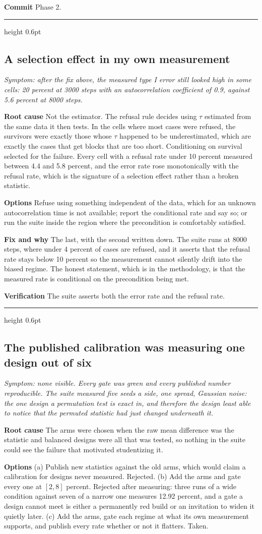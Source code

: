 \documentclass[11pt,a4paper]{article}
\newcommand{\entry}[2]{%
  \vspace{0.6em}%
  {\color{rulegrey}\hrule height 0.6pt}%
  \vspace{0.5em}%
  \subsection*{#1}%
  \textit{\small #2}\par\vspace{0.3em}%
}
\newcommand{\field}[1]{\vspace{0.35em}\textbf{#1}\quad}
\begin{document}
\field{Commit} Phase 2.

\entry{A selection effect in my own measurement}{Symptom: after the fix above,
the measured type I error still looked high in some cells: 20 percent at 3000
steps with an autocorrelation coefficient of 0.9, against 5.6 percent at 8000
steps.}

\field{Root cause} Not the estimator. The refusal rule decides using $\tau$
estimated from the same data it then tests. In the cells where most cases were
refused, the survivors were exactly those whose $\tau$ happened to be
underestimated, which are exactly the cases that get blocks that are too short.
Conditioning on survival selected for the failure. Every cell with a refusal rate
under 10 percent measured between 4.4 and 5.8 percent, and the error rate rose
monotonically with the refusal rate, which is the signature of a selection effect
rather than a broken statistic.

\field{Options} Refuse using something independent of the data, which for an
unknown autocorrelation time is not available; report the conditional rate and
say so; or run the suite inside the region where the precondition is comfortably
satisfied.

\field{Fix and why} The last, with the second written down. The suite runs at
8000 steps, where under 4 percent of cases are refused, and it asserts that the
refusal rate stays below 10 percent so the measurement cannot silently drift into
the biased regime. The honest statement, which is in the methodology, is that the
measured rate is conditional on the precondition being met.

\field{Verification} The suite asserts both the error rate and the refusal rate.

\entry{The published calibration was measuring one design out of six}{Symptom:
none visible. Every gate was green and every published number reproducible. The
suite measured five seeds a side, one spread, Gaussian noise: the one design a
permutation test is exact in, and therefore the design least able to notice that
the permuted statistic had just changed underneath it.}

\field{Root cause} The arms were chosen when the raw mean difference was the
statistic and balanced designs were all that was tested, so nothing in the suite
could see the failure that motivated studentizing it.

\field{Options} (a) Publish new statistics against the old arms, which would
claim a calibration for designs never measured. Rejected. (b) Add the arms and
gate every one at $[2, 8]$ percent. Rejected after measuring: three runs of a
wide condition against seven of a narrow one measures 12.92 percent, and a gate
a design cannot meet is either a permanently red build or an invitation to widen
it quietly later. (c) Add the arms, gate each regime at what its own measurement
supports, and publish every rate whether or not it flatters. Taken.
\end{document}
